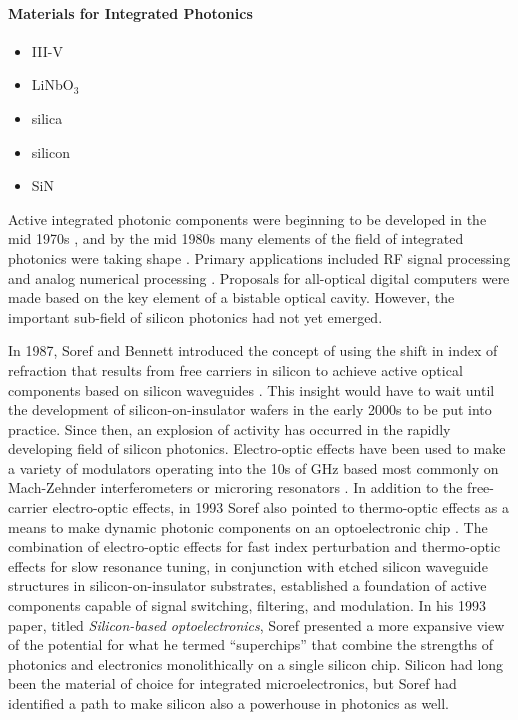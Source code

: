 \paragraph{Materials for Integrated Photonics}
\begin{itemize}
\item III-V
\item LiNbO$_3$
\item silica
\item silicon
\item SiN
\end{itemize}

\vspace{3em}
Active integrated photonic components were beginning to be developed in the mid 1970s \cite{ohno1975}, and by the mid 1980s many elements of the field of integrated photonics were taking shape \cite{ve1984}. Primary applications included RF signal processing and analog numerical processing \cite{ve1984}. Proposals for all-optical digital computers were made based on the key element of a bistable optical cavity. However, the important sub-field of silicon photonics had not yet emerged.

\vspace{3em}
In 1987, Soref and Bennett introduced the concept of using the shift in index of refraction that results from free carriers in silicon to achieve active optical components based on silicon waveguides \cite{sobe1987}. This insight would have to wait until the development of silicon-on-insulator wafers in the early 2000s to be put into practice. Since then, an explosion of activity has occurred in the rapidly developing field of silicon photonics. Electro-optic effects have been used to make a variety of modulators \cite{rema2010} operating into the 10s of GHz based most commonly on Mach-Zehnder interferometers \cite{lisa2005} or microring resonators \cite{xuma2007}. In addition to the free-carrier electro-optic effects, in 1993 Soref also pointed to thermo-optic effects as a means to make dynamic photonic components on an optoelectronic chip \cite{so1993}. The combination of electro-optic effects for fast index perturbation and thermo-optic effects for slow resonance tuning, in conjunction with etched silicon waveguide structures in silicon-on-insulator substrates, established a foundation of active components capable of signal switching, filtering, and modulation. In his 1993 paper, titled \textit{Silicon-based optoelectronics}, Soref presented a more expansive view of the potential for what he termed ``superchips'' that combine the strengths of photonics and electronics monolithically on a single silicon chip. Silicon had long been the material of choice for integrated microelectronics, but Soref had identified a path to make silicon also a powerhouse in photonics as well.

